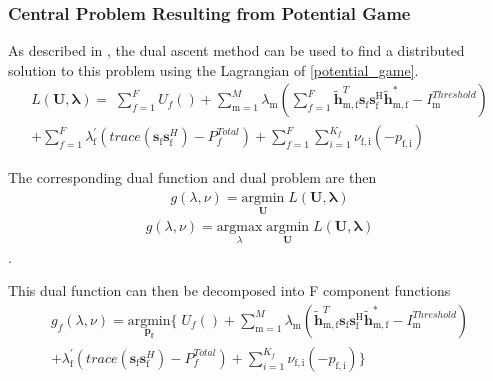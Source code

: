 \documentclass[12pt,a4paper]{report}
\begin{document}
\subsubsection{Central Problem Resulting from Potential Game}
As described in \cite[p.~8,9]{boyd2011distributed}, the dual ascent method can be used to find a distributed solution to this problem using the Lagrangian of \eqref{potential_game}. 
\\
\begin{multline}
L(\mathbf{U,\lambda}) = 
\;
\sum_{f=1}^F U_f() 
+
\sum_{\mathrm{m=1}}^M \lambda_{\mathrm{m}}
(	  \sum^F_{f=1} \mathbf{\tilde{h}}_{\mathrm{m,f}}^T  \mathbf{s}_{\mathrm{f}} 						
	\mathbf{s_{\mathrm{f}}^{\mathrm{H}}} \mathbf{\tilde{h}_{\mathrm{m,f}}^*} - I^{Threshold}		
	_{\mathrm{m}} )
\\
+ 
\sum_{f=1}^F
\lambda_{\mathrm{f}}^{'}(trace(\mathbf{s}_\mathrm{f}\mathbf{s}_\mathrm{f}^H)-P^{Total}_{f} )
+
\sum_{f=1}^F
\sum_{i=1}^{K_f}
\nu_{\mathrm{f,i}}(-p_{\mathrm{f,i}})
\end{multline}

The corresponding dual function and dual problem are then 
\begin{gather*}
g(\lambda,\nu) = \underset{\mathbf{U}}{\mathrm{argmin}}\;L(\mathbf{U,\lambda})
\end{gather*}
\begin{gather*}
g(\lambda,\nu) = \underset{\lambda}{\mathrm{argmax}}\;\underset{\mathbf{U}}{\mathrm{argmin}}\;L(\mathbf{U,\lambda})
\end{gather*}
.



This dual function can then be decomposed into F component functions
\begin{multline}
g_f(\lambda,\nu) = \underset{\mathbf{p_f}}{\mathrm{argmin}}
\{
\;
U_f() 
+
\sum_{\mathrm{m=1}}^M \lambda_{\mathrm{m}}
(\mathbf{\tilde{h}}_{\mathrm{m,f}}^T  \mathbf{s}_{\mathrm{f}} 						
	\mathbf{s_{\mathrm{f}}^{\mathrm{H}}} \mathbf{\tilde{h}_{\mathrm{m,f}}^*} - I^{Threshold}		
	_{\mathrm{m}} )
\\
+ 
\lambda_{\mathrm{f}}^{'}(trace(\mathbf{s}_\mathrm{f}\mathbf{s}_\mathrm{f}^H)-P^{Total}_{f} )
+
\sum_{i=1}^{K_f}
\nu_{\mathrm{f,i}}(-p_{\mathrm{f,i}})\}
\end{multline}
\\
\end{document}
